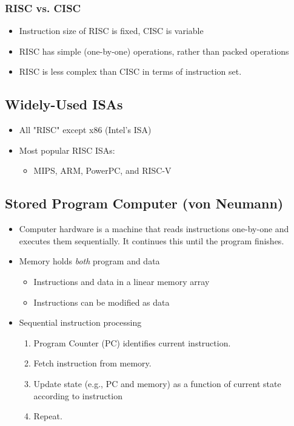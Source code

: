 \documentclass[10pt]{article}
\begin{document}
\subsubsection*{RISC vs. CISC}
\begin{itemize}
    \item Instruction size of RISC is fixed, CISC is variable
    \item RISC has simple (one-by-one) operations, rather than packed operations
    \item RISC is less complex than CISC in terms of instruction set.
\end{itemize}
\subsection*{Widely-Used ISAs}
\begin{itemize}
    \item All "RISC" except x86 (Intel's ISA)
    \item Most popular RISC ISAs:
    \begin{itemize}
        \item MIPS, ARM, PowerPC, and RISC-V
    \end{itemize}
\end{itemize}
\subsection*{Stored Program Computer (von Neumann)}
\begin{itemize}
    \item Computer hardware is a machine that reads instructions one-by-one and executes them sequentially.  It continues this until the program finishes.
    \item Memory holds \textit{both} program and data
    \begin{itemize}
        \item Instructions and data in a linear memory array
        \item Instructions can be modified as data
    \end{itemize}
    \item Sequential instruction processing
    \begin{enumerate}
        \item Program Counter (PC) identifies current instruction.
        \item Fetch instruction from memory.
        \item Update state (e.g., PC and memory) as a function of current state according to instruction
        \item Repeat.
    \end{enumerate}
\end{itemize}
\end{document}
